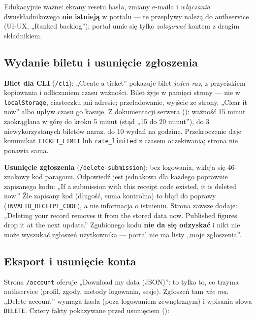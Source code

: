 {Edukacyjnie ważne: ekrany resetu hasła, zmiany e-maila i \emph{włączania}
dwuskładnikowego \textbf{nie istnieją} w portalu --- te przepływy należą do
authservice (UI-UX, „Ranked backlog”); portal umie się tylko \emph{zalogować}
kontem z drugim składnikiem.

\subsection{Wydanie biletu i usunięcie zgłoszenia}

\textbf{Bilet dla CLI} (\texttt{/cli}): „Create a ticket” pokazuje bilet
\emph{jeden raz}, z przyciskiem kopiowania i odliczaniem czasu ważności. Bilet
żyje w pamięci strony --- nie w \texttt{localStorage}, ciasteczku ani adresie;
przeładowanie, wyjście ze strony, „Clear it now” albo upływ czasu go kasuje.
Z dokumentacji serwera ():
ważność 15 minut zaokrąglana w górę do kroku 5 minut (stąd „15 do 20 minut”),
do 3 niewykorzystanych biletów naraz, do 10 wydań na godzinę. Przekroczenie
daje komunikat \texttt{TICKET\_LIMIT} lub \texttt{rate\_limited} z czasem
oczekiwania; strona nie ponawia sama.

\textbf{Usunięcie zgłoszenia} (\texttt{/\allowbreak{}delete-\allowbreak{}submission}): bez logowania,
wkleja się 46-znakowy kod paragonu. Odpowiedź jest jednakowa dla każdego
poprawnie zapisanego kodu: „If a submission with this receipt code existed, it
is deleted now.” Źle zapisany kod (długość, suma kontrolna) to błąd do poprawy
(\texttt{INVALID\_\allowbreak{}RECEIPT\_\allowbreak{}CODE}), a nie informacja o istnieniu. Strona
zawsze dodaje: „Deleting your record removes it from the stored data now.
Published figures drop it at the next update.” Zgubionego kodu \textbf{nie da się
odzyskać} i nikt nie może wyszukać zgłoszeń użytkownika --- portal nie ma
listy „moje zgłoszenia”.

\subsection{Eksport i usunięcie konta}

Strona \texttt{/account} oferuje „Download my data (JSON)”: to tylko to, co
trzyma authservice (profil, zgody, metody logowania, sesje). Zgłoszeń tam
\emph{nie ma}. „Delete account” wymaga hasła (poza logowaniem zewnętrznym) i
wpisania słowa \texttt{DELETE}. Cztery fakty pokazywane przed usunięciem
():

}

